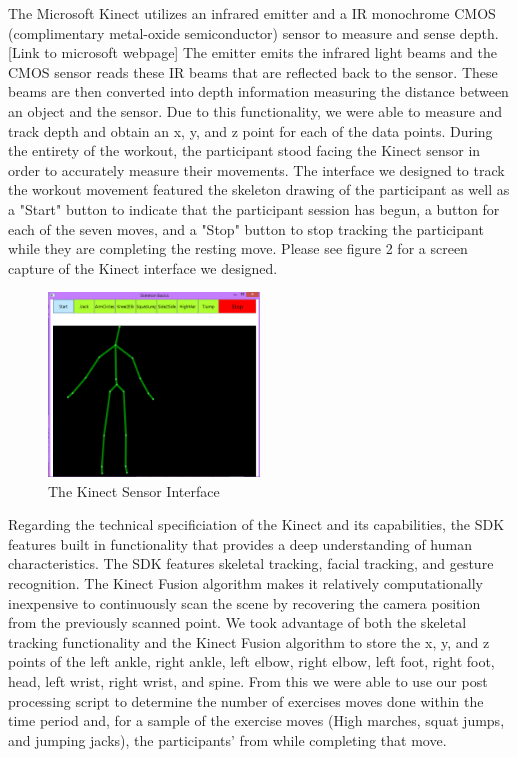 The Microsoft Kinect utilizes an infrared emitter and a IR monochrome CMOS (complimentary metal-oxide semiconductor) sensor to measure and sense depth. [Link to microsoft webpage]  The emitter emits the infrared light beams and the CMOS sensor reads these IR beams that are reflected back to the sensor.  These beams are then converted into depth information measuring the distance between an object and the sensor.  Due to this functionality, we were able to measure and track depth and obtain an x, y, and z point for each of the data points.   During the entirety of the workout, the participant stood facing the Kinect sensor in order to accurately measure their movements.  The interface we designed to track the workout movement featured the skeleton drawing of the participant as well as a "Start" button to indicate that the participant session has begun, a button for each of the seven moves, and a "Stop" button to stop tracking the participant while they are completing the resting move.  Please see figure 2 for a screen capture of the Kinect interface we designed.  \\
\begin{figure} [h]
	\includegraphics[width=0.5\textwidth]{figure2}
\caption{The Kinect Sensor Interface}
\end{figure}


Regarding the technical specificiation of the Kinect and its capabilities, the SDK features built in functionality that provides a deep understanding of human characteristics.  The SDK features skeletal tracking, facial tracking, and gesture recognition.  The Kinect Fusion algorithm makes it relatively computationally inexpensive to continuously scan the scene by recovering the camera position from the previously scanned point.  We took advantage of both the skeletal tracking functionality and the Kinect Fusion algorithm to store the x, y, and z points of the left ankle, right ankle, left elbow, right elbow, left foot, right foot, head, left wrist, right wrist, and spine.  From this we were able to use our post processing script to determine the number of exercises moves done within the time period and, for a sample of the exercise moves (High marches, squat jumps, and jumping jacks), the participants' from while completing that move.